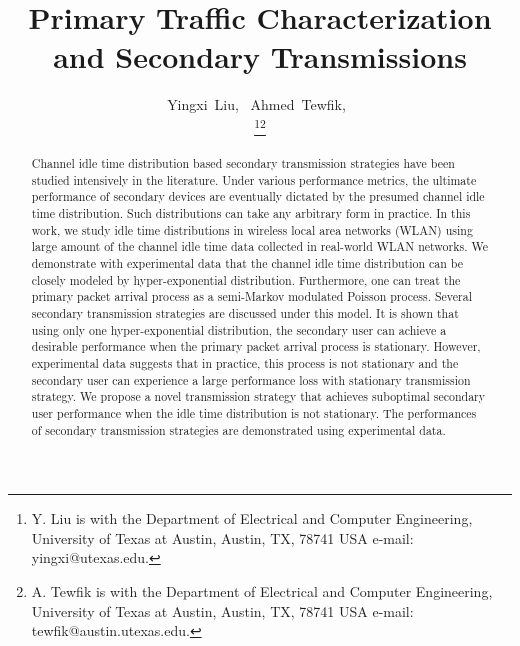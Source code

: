 \documentclass[10pt,final,journal,letterpaper]{IEEEtran}
\begin{document}
\title{Primary Traffic Characterization and Secondary Transmissions}


\author{Yingxi~Liu,~
        Ahmed~Tewfik,~\\\thanks{Y. Liu is with the Department of Electrical and Computer Engineering, University of Texas at Austin, Austin, TX, 78741 USA e-mail: yingxi@utexas.edu.}\thanks{A. Tewfik is with the Department of Electrical and Computer Engineering, University of Texas at Austin, Austin, TX, 78741 USA e-mail: tewfik@austin.utexas.edu.}}

















\maketitle


\begin{abstract}
Channel idle time distribution based secondary transmission strategies have been studied intensively in the literature. Under various performance metrics, the ultimate performance of secondary devices are eventually dictated by the presumed channel idle time distribution. Such distributions can take any arbitrary form in practice. In this work, we study idle time distributions in wireless local area networks (WLAN) using large amount of the channel idle time data collected in real-world WLAN networks. We demonstrate with experimental data that the channel idle time distribution can be closely modeled by hyper-exponential distribution. Furthermore, one can treat the primary packet arrival process as a semi-Markov modulated Poisson process. Several secondary transmission strategies are discussed under this model. It is shown that using only one hyper-exponential distribution, the secondary user can achieve a desirable performance when the primary packet arrival process is stationary. However, experimental data suggests that in practice, this process is not stationary and the secondary user can experience a large performance loss with stationary transmission strategy. We propose a novel transmission strategy that achieves suboptimal secondary user performance when the idle time distribution is not stationary. The performances of secondary transmission strategies are demonstrated using experimental data.
\end{abstract}
\end{document}
